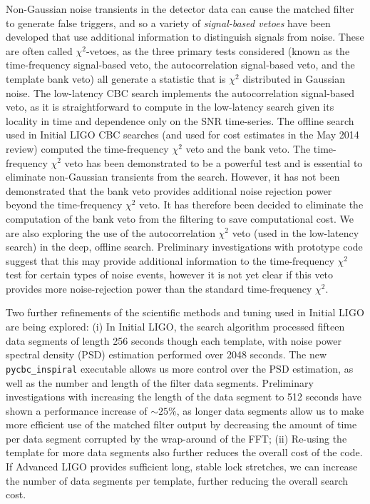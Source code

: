 Non-Gaussian noise transients in the detector data can cause the matched filter
to generate false triggers, and so a variety of \emph{signal-based vetoes}
have been developed that use additional information to distinguish signals
from noise. These are often called $\chi^2$-vetoes, as the three primary tests
considered (known as the time-frequency signal-based veto, the autocorrelation
signal-based veto, and the template bank veto) all generate a statistic that is
$\chi^2$ distributed in Gaussian noise. The low-latency CBC search implements
the autocorrelation signal-based veto, as it is straightforward to compute in
the low-latency search given its locality in time and dependence only on the
SNR time-series.
The offline search used in Initial LIGO
CBC searches (and used for cost estimates in the May 2014 review) computed the
time-frequency $\chi^2$ veto and the bank veto. The time-frequency $\chi^2$ veto
has been demonstrated to be a powerful test and is essential to eliminate
non-Gaussian transients from the search.  However, it has not been
demonstrated that the bank veto provides additional noise rejection power
beyond the time-frequency $\chi^2$ veto.  It has therefore been decided to
eliminate the computation of the bank veto from the filtering to save
computational cost.
We are also exploring the use of the autocorrelation $\chi^2$ veto (used in
the low-latency search) in the deep, offline search. Preliminary
investigations with prototype code suggest that this may provide additional information to the
time-frequency $\chi^2$ test for certain types of noise events, however it is
not yet clear if this veto provides more noise-rejection power than the standard
time-frequency $\chi^2$.

Two further refinements of the  scientific methods and tuning used in Initial
LIGO are being explored: (i)  In Initial LIGO, the search algorithm processed
fifteen data segments of length 256 seconds though each template, with noise
power spectral density (PSD) estimation performed over 2048 seconds. The new
\texttt{pycbc\_inspiral} executable allows us more control over the PSD
estimation, as well as the number and length of the filter data segments.
Preliminary investigations with increasing the length of the data segment to
512 seconds have shown a performance increase of $\sim 25\%$, as longer data
segments allow us to make more efficient use of the matched filter output by
decreasing the amount of time per data segment corrupted by the wrap-around
of the FFT; (ii) Re-using the template for more data segments also further
reduces the overall cost of the code. If Advanced LIGO provides sufficient
long, stable lock stretches, we can increase the number of data segments per
template, further reducing the overall search cost.


